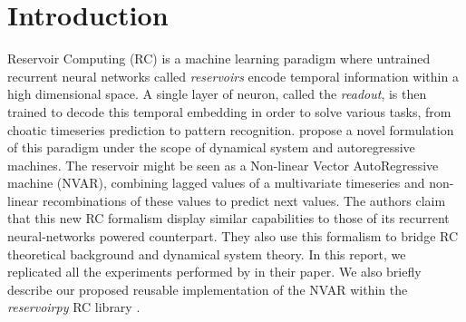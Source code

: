 
\section{Introduction}

Reservoir Computing (RC) is a machine learning paradigm where
untrained recurrent neural networks called \textit{reservoirs} encode
temporal information within a high dimensional space.
A single layer of neuron, called the \textit{readout},
is then trained to decode this temporal embedding in order
to solve various tasks, from choatic timeseries prediction to pattern recognition.
\citet{gauthier2021next} propose a novel formulation of this paradigm under
the scope of dynamical system and autoregressive machines.
The reservoir might be seen as a Non-linear Vector AutoRegressive machine (NVAR),
combining lagged values of a multivariate timeseries
and non-linear recombinations of these values to predict next values. The
authors claim that this new RC formalism display similar capabilities to those
of its recurrent neural-networks powered counterpart. They also use this formalism
to bridge RC theoretical background and dynamical system theory.
In this report, we replicated all the experiments performed by \citet{gauthier2021next} 
in their paper. We also briefly describe our proposed reusable implementation
of the NVAR within the \textit{reservoirpy} RC library \supercite{trouvain2020}.
